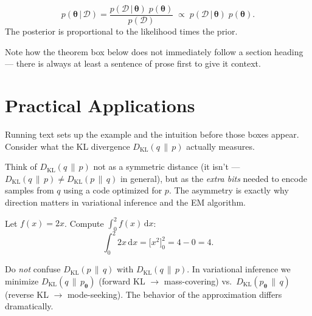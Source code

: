 \documentclass[11pt, oneside]{book}
\newcommand{\Prob}{\mathbb{P}}           %
\newcommand{\KL}[2]{D_{\mathrm{KL}}\!\left(#1 \,\|\, #2\right)}
\newcommand{\dd}{\,\mathrm{d}}
\newcommand{\dataset}{\mathcal{D}}       %
\newcommand{\params}{\boldsymbol{\theta}}   %
\newcommand{\given}{\,\vert\,}           %
\begin{document}
\begin{thmbox}[title={Bayes' Theorem}]
\[
  p(\params \given \dataset)
  = \frac{p(\dataset \given \params)\;p(\params)}{p(\dataset)}
  \;\propto\; p(\dataset \given \params)\;p(\params).
\]
The posterior is proportional to the likelihood times the prior.
\end{thmbox}

Note how the theorem box below does not immediately follow a
section heading — there is always at least a sentence of prose
first to give it context.

\section{Practical Applications}

Running text sets up the example and the intuition before
those boxes appear.
Consider what the KL divergence $\KL{q}{p}$ actually measures.

\begin{intbox}
Think of $\KL{q}{p}$ not as a symmetric distance
(it isn't — $\KL{q}{p} \neq \KL{p}{q}$ in general),
but as the \emph{extra bits} needed to encode samples from $q$
using a code optimized for $p$.
The asymmetry is exactly why direction matters in
variational inference and the EM algorithm.
\end{intbox}

\begin{exbox}[title={Simple Integration}]
Let $f(x) = 2x$.
Compute $\int_0^2 f(x)\dd x$:
\[
  \int_{0}^{2} 2x \dd x
  = \bigl[x^2\bigr]_{0}^{2}
  = 4 - 0 = 4.
\]
\end{exbox}

\begin{notebox}[title={Exam Trap}]
Do \emph{not} confuse $\KL{p}{q}$ with $\KL{q}{p}$.
In variational inference we minimize $\KL{q}{p_{\params}}$
(forward KL $\to$ mass-covering)
vs.\ $\KL{p_{\params}}{q}$ (reverse KL $\to$ mode-seeking).
The behavior of the approximation differs dramatically.
\end{notebox}
\end{document}
